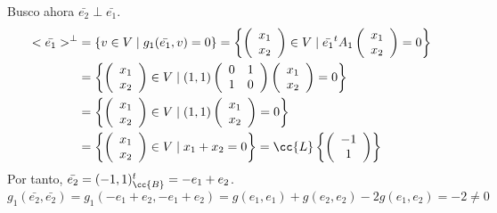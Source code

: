\begin{ejercicio}
\begin{enumerate}
        Busco ahora $\bar{e_2} \perp \bar{e_1}$.
        \begin{equation*}\begin{split}
            <\bar{e_1}>^\perp &= \{v \in V \mid g_1(\bar{e_1},v) = 0\} 
            = \left\{ \left(\begin{array}{c}
                 x_1 \\ x_2
            \end{array} \right) \in V \mid \bar{e_1}^t A_1
            \left(\begin{array}{c}
                 x_1 \\ x_2
            \end{array} \right) = 0\right\} \\
            &= \left\{ \left(\begin{array}{c}
                 x_1 \\ x_2
            \end{array} \right) \in V \mid (1,1)\left(\begin{array}{cc}
                0 & 1 \\
                1 & 0
            \end{array} \right) 
            \left(\begin{array}{c}
                 x_1 \\ x_2
            \end{array} \right) = 0\right\} \\
            &= \left\{ \left(\begin{array}{c}
                 x_1 \\ x_2
            \end{array} \right) \in V \mid (1,1)
            \left(\begin{array}{c}
                 x_1 \\ x_2
            \end{array} \right) = 0\right\} \\
            &= \left\{ \left(\begin{array}{c}
                 x_1 \\ x_2
            \end{array} \right) \in V \mid x_1+x_2 = 0\right\}
            = \cc{L} \left\{ \left(\begin{array}{c}
                 -1 \\ 1
            \end{array} \right) \right\}
        \end{split}\end{equation*}
        Por tanto, $\bar{e_2} = (-1,1)^t_\cc{B} = -e_1+e_2$.
        \begin{equation*}
            g_1(\bar{e_2}, \bar{e_2}) = g_1(-e_1+e_2, -e_1+e_2) = g(e_1,e_1) + g(e_2,e_2) - 2g(e_1, e_2) = -2 \neq 0
        \end{equation*}


\end{enumerate}
\end{ejercicio}
